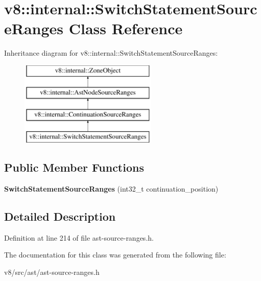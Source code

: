 \hypertarget{classv8_1_1internal_1_1SwitchStatementSourceRanges}{}\section{v8\+:\+:internal\+:\+:Switch\+Statement\+Source\+Ranges Class Reference}
\label{classv8_1_1internal_1_1SwitchStatementSourceRanges}
Inheritance diagram for v8\+:\+:internal\+:\+:Switch\+Statement\+Source\+Ranges\+:\begin{figure}[H]
\begin{center}
\leavevmode
\includegraphics[height=4.000000cm]{classv8_1_1internal_1_1SwitchStatementSourceRanges}
\end{center}
\end{figure}
\subsection*{Public Member Functions}
\begin{DoxyCompactItemize}
\item 
\mbox{\label{classv8_1_1internal_1_1SwitchStatementSourceRanges_a6e63db2eb2cddfb0235fdaccc5127d76}} 
{\bfseries Switch\+Statement\+Source\+Ranges} (int32\+\_\+t continuation\+\_\+position)
\end{DoxyCompactItemize}


\subsection{Detailed Description}


Definition at line 214 of file ast-\/source-\/ranges.\+h.



The documentation for this class was generated from the following file\+:\begin{DoxyCompactItemize}
\item 
v8/src/ast/ast-\/source-\/ranges.\+h\end{DoxyCompactItemize}

